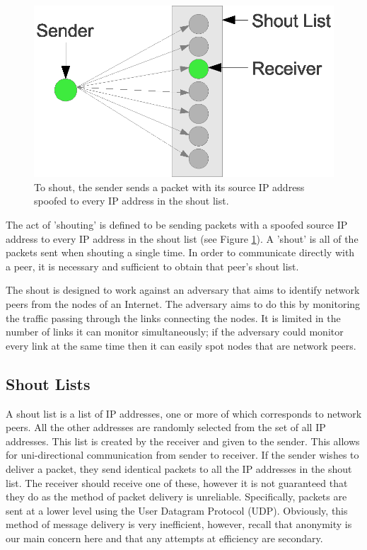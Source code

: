 \documentclass[ %
                    author={Luke Murray},
                supervisor={Dr. Simon Hollis},
                     title={Shadow Peer-to-Peer Networks},
                  subtitle={},
                    degree={MEng},
                      year={2013} ]{thesis}
\begin{document}
\begin{figure}[h]
    \centering
    \includegraphics{diagrams/shouting.eps}
    \caption{To shout, the sender sends a packet with its source IP address spoofed to every IP address in the shout list.}
    \label{shouting}
\end{figure}

The act of 'shouting' is defined to be sending packets with a spoofed source IP address to every IP address in the shout list (see Figure \ref{shouting}). A 'shout' is all of the packets sent when shouting a single time. In order to communicate directly with a peer, it is necessary and sufficient to obtain that peer's shout list.

The shout is designed to work against an adversary that aims to identify network peers from the nodes of an Internet. The adversary aims to do this by monitoring the traffic passing through the links connecting the nodes. It is limited in the number of links it can monitor simultaneously; if the adversary could monitor every link at the same time then it can easily spot nodes that are network peers.

\subsection{Shout Lists}

A shout list is a list of IP addresses, one or more of which corresponds to network peers. All the other addresses are randomly selected from the set of all IP addresses. This list is created by the receiver and given to the sender. This allows for uni-directional communication from sender to receiver. If the sender wishes to deliver a packet, they send identical packets to all the IP addresses in the shout list. The receiver should receive one of these, however it is not guaranteed that they do as the method of packet delivery is unreliable. Specifically, packets are sent at a lower level using the User Datagram Protocol (UDP). Obviously, this method of message delivery is very inefficient, however, recall that anonymity is our main concern here and that any attempts at efficiency are secondary.
\end{document}
